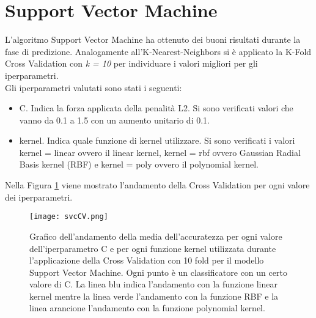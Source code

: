 \section{Support Vector Machine}
L'algoritmo Support Vector Machine ha ottenuto dei buoni risultati durante la fase di predizione. Analogamente all'K-Nearest-Neighbors si è applicato la K-Fold Cross Validation con \emph{k = 10} per individuare i valori migliori per gli iperparametri.\\
Gli iperparametri valutati sono stati i seguenti:
\begin{itemize}
	\item \textsf{C}. Indica la forza applicata della penalità L2. Si sono verificati valori che vanno da 0.1 a 1.5 con un aumento unitario di 0.1.
	\item \textsf{kernel}. Indica quale funzione di kernel utilizzare. Si sono verificati i valori kernel = linear ovvero il linear kernel, kernel = rbf ovvero Gaussian Radial Basis kernel (RBF) e kernel = poly ovvero il polynomial kernel.
\end{itemize}

Nella Figura \ref{fig:svcCV} viene mostrato l'andamento della Cross Validation per ogni valore dei iperparametri.
\begin{figure}[]
	\begin{center}
		\texttt{[image: svcCV.png]}
		\caption{Grafico dell'andamento della media dell'accuratezza per ogni valore dell'iperparametro C e per ogni funzione kernel utilizzata durante l'applicazione della Cross Validation con 10 fold per il modello Support Vector Machine. Ogni punto è un classificatore con un certo valore di C. La linea blu indica l'andamento con la funzione linear kernel mentre la linea verde l'andamento con la funzione RBF e	la linea arancione l'andamento con la funzione polynomial kernel.
		} 
		\label{fig:svcCV}
	\end{center}
\end{figure}

